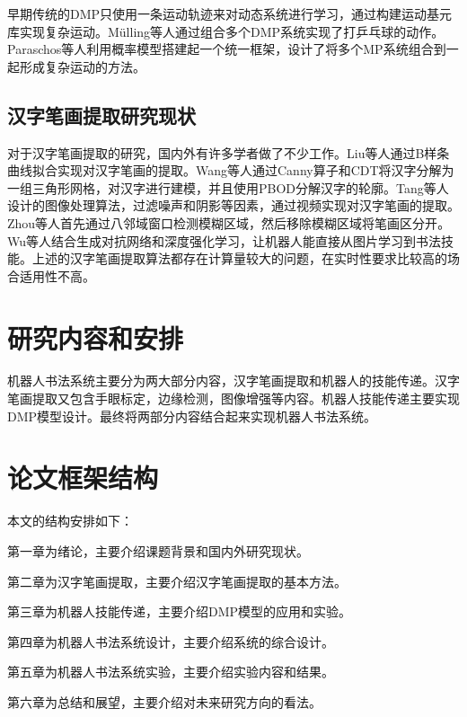 早期传统的DMP只使用一条运动轨迹来对动态系统进行学习，通过构建运动基元库实现复杂运动。Mülling等人通过组合多个DMP系统实现了打乒乓球的动作\cite{Mulling2013}。Paraschos等人利用概率模型搭建起一个统一框架，设计了将多个MP系统组合到一起形成复杂运动的方法\cite{Paraschos2017}\cite{Paraschos2018}。

\subsection{汉字笔画提取研究现状}
对于汉字笔画提取的研究，国内外有许多学者做了不少工作。Liu等人通过B样条曲线拟合实现对汉字笔画的提取\cite{Liu2007a}。Wang等人通过Canny算子和CDT将汉字分解为一组三角形网格，对汉字进行建模，并且使用PBOD分解汉字的轮廓\cite{Wang2013}。Tang等人设计的图像处理算法，过滤噪声和阴影等因素，通过视频实现对汉字笔画的提取\cite{Tang2005}。Zhou等人首先通过八邻域窗口检测模糊区域，然后移除模糊区域将笔画区分开\cite{Zhou2017}。Wu等人结合生成对抗网络和深度强化学习，让机器人能直接从图片学习到书法技能\cite{Wu2020}。上述的汉字笔画提取算法都存在计算量较大的问题，在实时性要求比较高的场合适用性不高。

\section{研究内容和安排}
机器人书法系统主要分为两大部分内容，汉字笔画提取和机器人的技能传递。汉字笔画提取又包含手眼标定，边缘检测，图像增强等内容。机器人技能传递主要实现DMP模型设计。最终将两部分内容结合起来实现机器人书法系统。

\section{论文框架结构}
本文的结构安排如下：

第一章为绪论，主要介绍课题背景和国内外研究现状。

第二章为汉字笔画提取，主要介绍汉字笔画提取的基本方法。

第三章为机器人技能传递，主要介绍DMP模型的应用和实验。

第四章为机器人书法系统设计，主要介绍系统的综合设计。

第五章为机器人书法系统实验，主要介绍实验内容和结果。

第六章为总结和展望，主要介绍对未来研究方向的看法。


